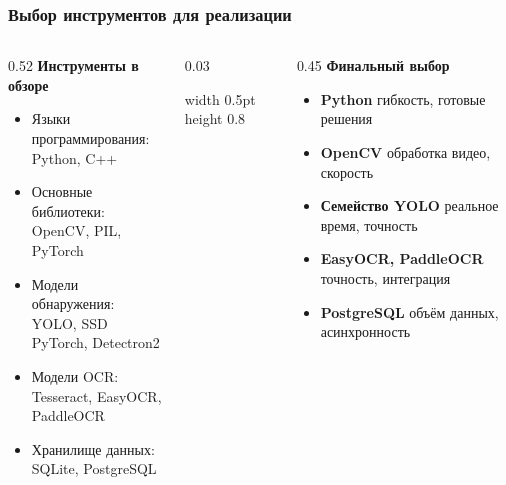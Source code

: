 \documentclass{beamer}
\begin{document}

\begin{frame}
\frametitle{Выбор инструментов для реализации}

\vspace{1.5em}
\begin{columns}[T,onlytextwidth]
    \vspace{3.5em}
    \begin{column}{0.52\textwidth}
        \textbf{Инструменты в обзоре}
        \begin{itemize}
            \item Языки программирования: \\
            Python, C++
            \item Основные библиотеки: \\
            OpenCV, PIL, PyTorch
            \item Модели обнаружения: \\
            YOLO, SSD PyTorch, Detectron2
            \item Модели OCR: \\
            Tesseract, EasyOCR, PaddleOCR
            \item Хранилище данных: \\
            SQLite, PostgreSQL
        \end{itemize}
    \end{column}

    \begin{column}{0.03\textwidth}
        \begin{center}
            \vrule width 0.5pt height 0.8\textheight
        \end{center}
    \end{column}

    \begin{column}{0.45\textwidth}
        \textbf{Финальный выбор}
        \begin{itemize}
            \item \textbf{Python} \newline гибкость, готовые решения
            \item \textbf{OpenCV} \newline обработка видео, скорость
            \item \textbf{Семейство YOLO} \newline реальное время, точность
            \item \textbf{EasyOCR, PaddleOCR} \newline точность, интеграция 
            \item \textbf{PostgreSQL} \newline объём данных, асинхронность
        \end{itemize}
    \end{column}
\end{columns}
\end{frame}
\end{document}
